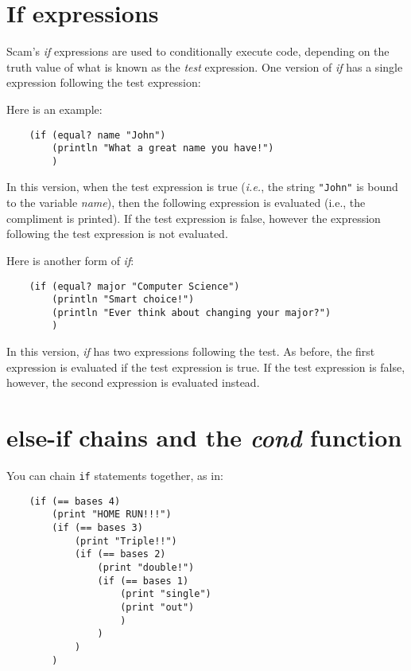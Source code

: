 \section{If expressions}

Scam's {\it if} expressions are used to conditionally execute code,
depending on the truth value of what is known as the
{\it test} expression. One version of {\it if} has a single expression 
following the test expression:

Here is an example:

\begin{verbatim}
    (if (equal? name "John")
        (println "What a great name you have!")
        )
\end{verbatim}

In this version, when the test expression is true ({\it i.e.}, 
the string {\tt "John"} is bound to the variable {\it name}), 
then the following expression is evaluated 
(i.e., the compliment
is printed).
If the test expression is false, however the
expression following the test expression is not evaluated.

Here is another form of {\it if}:

\begin{verbatim}
    (if (equal? major "Computer Science")
        (println "Smart choice!")
        (println "Ever think about changing your major?")
        )
\end{verbatim}

In this version, {\it if} has two expressions following
the test.
As before, the first expression is evaluated if the test expression
is true. If the test expression is false, however,
the second expression is evaluated instead.

\section{else-if chains and the {\it cond} function}

You can chain {\tt if} statements together, as in:

\begin{verbatim}
    (if (== bases 4)
        (print "HOME RUN!!!")
        (if (== bases 3)
            (print "Triple!!")
            (if (== bases 2)
                (print "double!")
                (if (== bases 1) 
                    (print "single")
                    (print "out")
                    )
                )
            )
        )
\end{verbatim}

